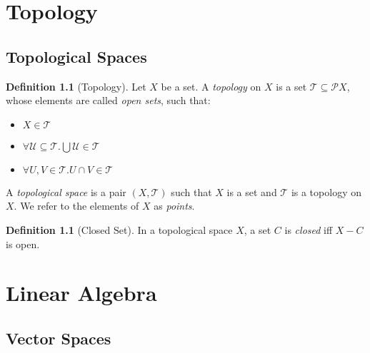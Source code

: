 \documentclass{book}
\theoremstyle{definition}
\newtheorem{df}[ax]{Definition}
\begin{document}
\chapter{Topology}

\section{Topological Spaces}

\begin{df}[Topology]
Let $X$ be a set. A \emph{topology} on $X$ is a set $\mathcal{T} \subseteq \mathcal{P} X$, whose elements are called \emph{open sets}, such that:
\begin{itemize}
\item $X \in \mathcal{T}$
\item $\forall \mathcal{U} \subseteq \mathcal{T}. \bigcup \mathcal{U} \in \mathcal{T}$
\item $\forall U,V \in \mathcal{T}. U \cap V \in \mathcal{T}$
\end{itemize}
A \emph{topological space} is a pair $(X, \mathcal{T})$ such that $X$ is a set and $\mathcal{T}$ is a topology on $X$. We refer to the elements of $X$ as \emph{points}.
\end{df}

\begin{df}[Closed Set]
In a topological space $X$, a set $C$ is \emph{closed} iff $X - C$ is open.
\end{df}

\chapter{Linear Algebra}

\section{Vector Spaces}
\end{document}
